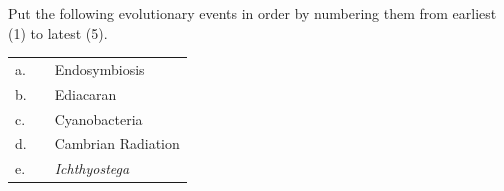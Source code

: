 \question[5]
Put the following evolutionary events in order by numbering them from earliest (1) to latest (5).
\vspace*{\baselineskip}


\begin{tabular}{@{}L{0.35cm}R{1.1cm}l@{}}
a.  &     &   Endosymbiosis \\[1em]


b.  &     &   Ediacaran \\[1em]

c.  &     &   Cyanobacteria \\[1em]

d.  &     &   Cambrian Radiation \\[1em]

e.  &     &   \textit{Ichthyostega} \\

\end{tabular}


